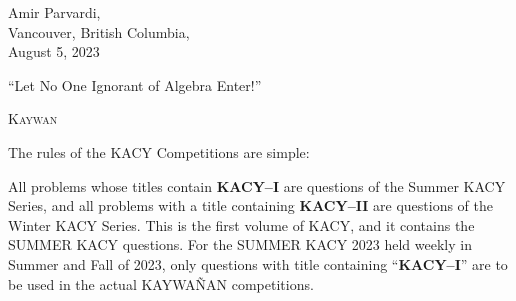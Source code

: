 \documentclass[12pt,a4paper]{memoir}
\theoremstyle{definition}
\begin{document}
\Large
		\begin{flushright}
			Amir Parvardi,\\
			Vancouver, British Columbia,\\
			August 5, 2023
		\end{flushright}
	
	\newpage
	\normalsize
	\tableofcontents\label{TOC}
	
	\normalsize
	\pagestyle{fancy}
	\fancyhf{}

	\newpage

	\begin{tcolorbox}
		\begin{displayquote}
			``Let No One Ignorant of Algebra Enter!''
			\begin{flushright}
				\LARGE \textsc{Kaywan}
			\end{flushright}
		\end{displayquote}
	\end{tcolorbox}
	
\vspace{1em}
	
	The rules of the KACY Competitions are simple: 
	\begin{idea}
		\begin{tasks}
			\task All problems whose titles contain \textbf{KACY--I} are questions of the Summer KACY Series, and all problems with a title containing \textbf{KACY--II} are questions of the Winter KACY Series.
			\task This is the first volume of KACY, and it contains the SUMMER KACY questions. For the SUMMER KACY 2023 held weekly in Summer and Fall of 2023, only questions with title containing ``\textbf{KACY--I}'' are to be used in the actual KAYWAÑAN competitions.
		\end{tasks}
	\end{idea}
	
\end{document}
